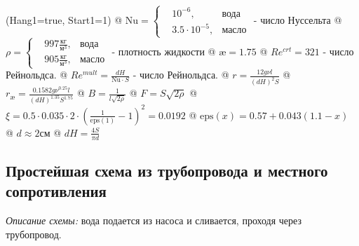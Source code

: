 \documentclass[12pt, a4paper]{article}
\begin{document}
\begin{easylist}
\ListProperties(Hang1=true, Start1=1)
@ $ \mathrm{Nu} = \left\{
\begin{aligned}
& 10^{-6},  &\text{вода} \\
& 3.5 \cdot 10^{-5}, &\text{масло}
\end{aligned}
\right. $ - число Нуссельта
@ $ \rho = \left\{
\begin{aligned}
& 997 \frac{\text{кг}}{\text{м}^3},  &\text{вода} \\
& 905 \frac{\text{кг}}{\text{м}^3}, &\text{масло}
\end{aligned}
\right. $ - плотность жидкости
@ $ \text{\ae} = 1.75 $
@ $ Re^{crt} = 321 $ - число Рейнольдса.
@ $ Re^{mult} = \frac{dH}{\mathrm{Nu} \cdot S} $ - число Рейнольдса.
@ $ r = \frac{12g\nu l}{(dH)^2 S} $
@ $ r_\text{\ae} = \frac{0.1582 g \nu^{0.25} l}{(dH)^{1.35} S^{1.75}} $
@ $ B = \frac{1}{l\sqrt{2\rho}} $
@ $ F = S\sqrt{2\rho} $
@ $ \xi = 0.5 \cdot 0.035 \cdot 2 \cdot \left(\frac{1}{\mathrm{eps}(1)} - 1\right)^2 = 0.0192 $
@ $ \mathrm{eps}(x) = 0.57 + 0.043(1.1 - x) $
@ $ d \approx 2 \text{см} $
@ $ dH = \frac{4S}{\pi d} $
\end{easylist}

\subsection{Простейшая схема из трубопровода и местного сопротивления}

\textit{Описание схемы:} вода подается из насоса и сливается, проходя через трубопровод.
\end{document}
